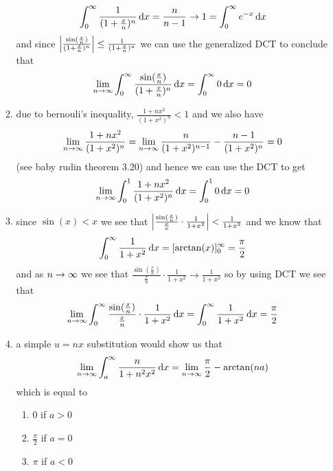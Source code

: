 \documentclass{article}
\begin{document}
\begin{homeworkProblem}
\begin{enumerate}[label=\alph*.]
\begin{enumerate}[label=$\bullet$]
            \[
                \int_0^\infty\frac{1}{(1+\frac{x}{n})^n}\mathop{}\!\mathrm{d} x=\frac{n}{n-1}\to 1 = \int_0^\infty e^{-x}\mathop{}\!\mathrm{d} x
            \]
            and since $\abs{\frac{\sin(\frac{x}{n})}{(1+\frac{x}{n})^n}}\leq \frac{1}{(1+\frac{x}{n})^n}$ we can use the generalized DCT to conclude that
            \[
                \lim_{n\to\infty}\int_0^\infty\frac{\sin(\frac{x}{n})}{(1+\frac{x}{n})^n}\mathop{}\!\mathrm{d} x=\int_0^\infty0\mathop{}\!\mathrm{d} x = 0
            \]
            \item due to bernouli's inequality, $\frac{1+nx^2}{(1+x^2)^n}<1$ and we also have
            \[
                \lim_{n\to\infty}\frac{1+nx^2}{(1+x^2)^n}=\lim_{n\to\infty}\frac{n}{(1+x^2)^{n-1}}-\frac{n-1}{(1+x^2)^n} = 0
            \]
            (see baby rudin theorem 3.20) and hence we can use the DCT to get
            \[
                \lim_{n\to\infty}\int_0^1\frac{1+nx^2}{(1+x^2)^n}\mathop{}\!\mathrm{d} x=\int_0^1 0\mathop{}\!\mathrm{d} x= 0
            \]
            \item since $\sin(x)<x$ we see that $\abs{\frac{\sin(\frac{x}{n})}{\frac{x}{n}}\cdot\frac{1}{1+x^2}}<\frac{1}{1+x^2}$ and we know that
            \[
                \int_0^\infty \frac{1}{1+x^2}\mathop{}\!\mathrm{d} x=[\arctan(x)]_0^\infty=\frac{\pi}{2}
            \]
            and as $n\to\infty$ we see that $\frac{\sin(\frac{x}{n})}{\frac{x}{n}}\cdot\frac{1}{1+x^2}\to \frac{1}{1+x^2}$ so by using DCT we see that
            \[
                \lim_{n\to\infty}\int_0^\infty \frac{\sin(\frac{x}{n})}{\frac{x}{n}}\cdot\frac{1}{1+x^2}\mathop{}\!\mathrm{d} x =\int_0^\infty \frac{1}{1+x^2} \mathop{}\!\mathrm{d} x= \frac{\pi}{2}
            \]
            \item a simple $u=nx$ substitution would show us that
            \[
                \lim_{n\to\infty}\int_a^\infty \frac{n}{1+n^2x^2} \mathop{}\!\mathrm{d} x = \lim_{n\to\infty} \frac{\pi}{2}-\arctan(na)
            \]
            which is equal to
            \begin{enumerate}[label=$\bullet$]
                \item $0$ if $a>0$
                \item $\frac{\pi}{2}$ if $a=0$
                \item $\pi$ if $a<0$
            \end{enumerate}
        \end{enumerate}
    \end{enumerate}
\end{homeworkProblem}
\end{document}
